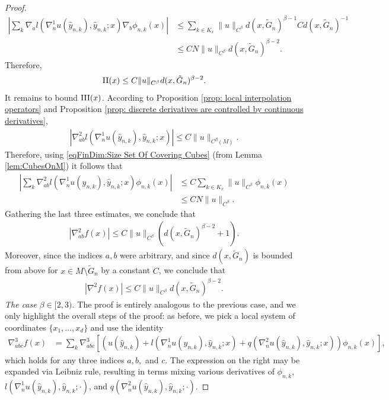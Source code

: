 \documentclass[11pt,reqno]{amsart}
\numberwithin{equation}{section}
\theoremstyle{plain}
\begin{document}
\begin{proof}
  \begin{align*}
    \left | \sum \limits_{k} \nabla_a l( \nabla^1_n u (\hat y_{n,k}),\hat y_{n,k};x) \nabla_b \phi_{n,k}(x) \right | & \leq \sum \limits_{k\in K_x}\|u\|_{C^\beta}d(x,\tilde G_n)^{\beta-1}Cd(x,\tilde G_n)^{-1}\\
    & \leq CN \|u\|_{C^{\beta}}d(x,\tilde G_n)^{\beta-2}.	
  \end{align*}
  Therefore,
  \begin{align*}
    \textnormal{II}(x) \leq C \|u\|_{C^{\beta}}d(x,\tilde G_n)^{\beta-2}.	
  \end{align*}
  It remains to bound $\textnormal{III}(x)$. According to Proposition \ref{prop: local interpolation operators} and Proposition \ref{prop: discrete derivatives are controlled by continuous derivatives},
  \begin{align*}
    |\nabla_{ab}^2l( \nabla^1_n u (\hat y_{n,k}),\hat y_{n,k};x)| \leq C\|u\|_{C^\beta(M)}.
  \end{align*}
  Therefore, using \eqref{eqFinDim:Size Set Of Covering Cubes} (from Lemma \ref{lem:CubesOnM}) it follows that
  \begin{align*}
    \left | \sum \limits_{k} \nabla_{ab}^2l( \nabla^1_n u (\hat y_{n,k}),\hat y_{n,k};x) \phi_{n,k}(x) \right | & \leq C\sum \limits_{k\in K_x}\|u\|_{C^\beta}\phi_{n,k}(x)\\
	& \leq CN \|u\|_{C^\beta}.
  \end{align*}
  Gathering the last three estimates, we conclude that
  \begin{align*} 
    |\nabla^2_{ab}f(x)|\leq C\|u\|_{C^\beta}(d(x,\tilde G_n)^{\beta-2}+1).
  \end{align*}
  Moreover, since the indices $a,b$ were arbitrary, and since $d(x,\tilde G_n)$ is bounded from above for $x \in M \setminus \tilde G_n$ by a constant $C$, we conclude that
  \begin{align*} 
    |\nabla^2f(x)|\leq C\|u\|_{C^\beta}d(x,\tilde G_n)^{\beta-2}.
  \end{align*}
  \emph{The case $\beta \in [2,3)$.} The proof is entirely analogous to the previous case, and we only highlight the overall steps of the proof: as before, we pick a local system of coordinates $\{x_1,\ldots,x_d\}$ and use the identity
  \begin{align*}
    \nabla^3_{abc}f(x) & =  \sum \limits_{k} \nabla_{abc}^3\left [ \left ( u(\hat y_{n,k})+l( \nabla^1_n u (\hat y_{n,k}),\hat y_{n,k};x) + q(\nabla^2_nu (\hat y_{n,k} ),\hat y_{n,k};x) \right )\phi_{n,k}(x) \right ],
  \end{align*}
  which  holds for any three indices $a,b,$ and $c$. The expression on the right may be expanded via Leibniz rule, resulting in terms mixing various derivatives of $\phi_{n,k}$, $l( \nabla^1_n u (\hat y_{n,k}),\hat y_{n,k};\cdot )$, and $q(\nabla^2_n u (\hat y_{n,k}),\hat y_{n,k};\cdot )$. 


\end{proof}
\end{document}

